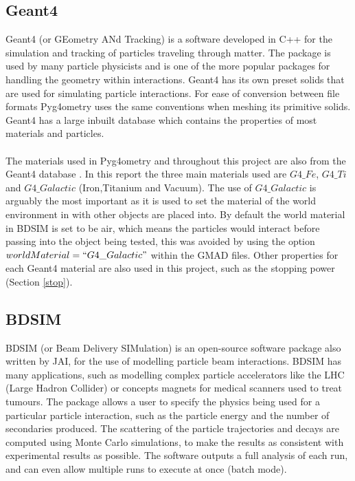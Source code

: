 \documentclass[12pt,a4paper]{article}
\begin{document}
\subsection{Geant4}\label{geant4}
\label{g4}
Geant4 (or GEometry ANd Tracking) is a software developed in C++ for the simulation and tracking of particles traveling through matter. The package is used by many particle physicists and is one of the more popular packages for handling the geometry within interactions. Geant4 has its own preset solids that are used for simulating particle interactions. For ease of conversion between file formats Pyg4ometry uses the same conventions when meshing its primitive solids. Geant4 has a large inbuilt database which contains the properties of most materials and particles.
\\\\
The materials used in Pyg4ometry and throughout this project are also from the Geant4 database \cite{mater}. In this report the three main materials used are $G4\_Fe$, $G4\_Ti$ and $G4\_Galactic$ (Iron,Titanium and Vacuum). The use of $G4\_Galactic$ is arguably the most important as it is used to set the material of the world environment in with other objects are placed into. By default the world material in BDSIM is set to be air, which means the particles would interact before passing into the object being tested, this was avoided by using the option $worldMaterial=``G4\_Galactic"$ within the GMAD files. Other properties for each Geant4 material are also used in this project, such as the stopping power (Section \ref{stop}). 

\subsection{BDSIM}
\label{bdsim}
BDSIM (or Beam Delivery SIMulation) is an open-source software package also written by JAI, for the use of modelling particle beam interactions. BDSIM has many applications, such as modelling complex particle accelerators like the LHC (Large Hadron Collider) or concepts magnets for medical scanners used to treat tumours. The package allows a user to specify the physics being used for a particular particle interaction, such as the particle energy and the number of secondaries produced. The scattering of the particle trajectories and decays are computed using Monte Carlo simulations, to make the results as consistent with experimental results as possible. The software outputs a full analysis of each run, and can even allow multiple runs to execute at once (batch mode).
\end{document}
